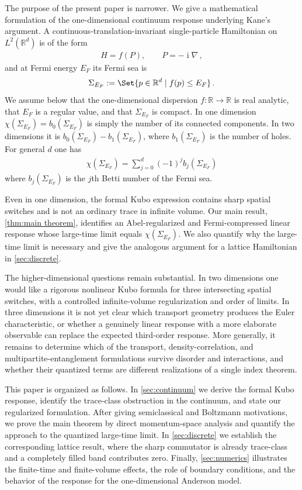 \documentclass[a4paper,10pt]{article}
\numberwithin{equation}{section}
\theoremstyle{plain}
\theoremstyle{plain}
\theoremstyle{plain}
\theoremstyle{plain}
\theoremstyle{plain}
\theoremstyle{remark}
\theoremstyle{definition}
\theoremstyle{plain}
\newcommand{\ii}{\operatorname{i}}
\newcommand{\RR}{\mathbb{R}}
\newcommand{\eq}[1]{\begin{align*}#1\end{align*}}
\newcommand{\eql}[1]{\begin{align}#1\end{align}}
\begin{document}
    The purpose of the present paper is narrower. We give a mathematical
    formulation of the one-dimensional continuum response underlying Kane's
    argument. A continuous-translation-invariant single-particle Hamiltonian
    on $L^2(\RR^d)$ is of the form
    \eq{H=f(P),\qquad P=-\ii\nabla\,,}
    and at Fermi energy $E_F$ its Fermi sea is
    \eq{\Sigma_{E_F}:=\Set{p\in\RR^d\mid f(p)\leq E_F}\,.}
    We assume below that the one-dimensional dispersion $f:\RR\to\RR$ is real analytic, that
    $E_F$ is a regular value, and that $\Sigma_{E_F}$ is compact. In one
    dimension $\chi(\Sigma_{E_F})=b_0(\Sigma_{E_F})$ is simply the number of
    its connected components. In two dimensions it is
    $b_0(\Sigma_{E_F})-b_1(\Sigma_{E_F})$, where $b_1(\Sigma_{E_F})$ is the number of holes. For general $d$ one has \eql{\chi(\Sigma_{E_F}) = \sum_{j=0}^d (-1)^{j}b_j(\Sigma_{E_F})} where $b_j(\Sigma_{E_F})$ is the $j$th Betti number of the Fermi sea.

    Even in one dimension, the formal Kubo expression contains sharp spatial
    switches and is not an ordinary trace in infinite volume. Our main result,
    \cref{thm:main theorem}, identifies an Abel-regularized and
    Fermi-compressed linear response whose large-time limit equals
    $\chi(\Sigma_{E_F})$. We also quantify why the large-time limit is
    necessary and give the analogous argument for a lattice Hamiltonian in
    \cref{sec:discrete}.

    The higher-dimensional questions remain substantial. In two dimensions
    one would like a rigorous nonlinear Kubo formula for three intersecting
    spatial switches, with a controlled infinite-volume regularization and
    order of limits. In three dimensions it is not yet clear which transport
    geometry produces the Euler characteristic, or whether a genuinely linear
    response with a more elaborate observable can replace the expected
    third-order response. More generally, it remains to determine which of the
    transport, density-correlation, and multipartite-entanglement formulations
    survive disorder and interactions, and whether their quantized terms are
    different realizations of a single index theorem.

    
    This paper is organized as follows.  In \cref{sec:continuum} we derive the formal Kubo response, identify the trace-class obstruction in the continuum, and state our regularized formulation.  After giving semiclassical and Boltzmann motivations, we prove the main theorem by direct momentum-space analysis and quantify the approach to the quantized large-time limit.  In \cref{sec:discrete} we establish the corresponding lattice result, where the sharp commutator is already trace-class and a completely filled band contributes zero.  Finally, \cref{sec:numerics} illustrates the finite-time and finite-volume effects, the role of boundary conditions, and the behavior of the response for the one-dimensional Anderson model.
\end{document}
